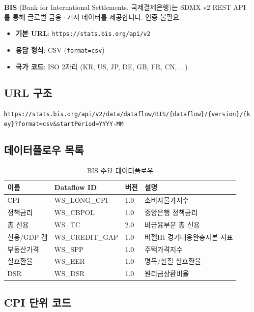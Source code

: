 \documentclass[11pt,a4paper]{article}
\newcommand{\apibox}[1]{%
    \noindent\colorbox{lightaccent}{\parbox{\dimexpr\textwidth-2\fboxsep}{%
        \small\texttt{#1}%
    }}%
    \vspace{0.5em}%
}
\newcommand{\code}[1]{\texttt{#1}}
\begin{document}
\textbf{BIS} (Bank for International Settlements, 국제결제은행)는 SDMX v2 REST API를 통해
글로벌 금융·거시 데이터를 제공합니다. 인증 불필요.

\begin{itemize}[leftmargin=2em]
    \item \textbf{기본 URL}: \code{https://stats.bis.org/api/v2}
    \item \textbf{응답 형식}: CSV (\code{format=csv})
    \item \textbf{국가 코드}: ISO 2자리 (KR, US, JP, DE, GB, FR, CN, ...)
\end{itemize}

\subsection{URL 구조}

\apibox{https://stats.bis.org/api/v2/data/dataflow/BIS/\{dataflow\}/\{version\}/\{key\}?format=csv\&startPeriod=YYYY-MM}

\subsection{데이터플로우 목록}

\begin{table}[h]
\centering
\caption{BIS 주요 데이터플로우}
\begin{tabularx}{\textwidth}{l l l X}
\toprule
\textbf{이름} & \textbf{Dataflow ID} & \textbf{버전} & \textbf{설명} \\
\midrule
CPI           & WS\_LONG\_CPI    & 1.0 & 소비자물가지수 \\
정책금리       & WS\_CBPOL        & 1.0 & 중앙은행 정책금리 \\
총 신용        & WS\_TC           & 2.0 & 비금융부문 총 신용 \\
신용/GDP 갭    & WS\_CREDIT\_GAP  & 1.0 & 바젤III 경기대응완충자본 지표 \\
부동산가격     & WS\_SPP          & 1.0 & 주택가격지수 \\
실효환율       & WS\_EER          & 1.0 & 명목/실질 실효환율 \\
DSR            & WS\_DSR          & 1.0 & 원리금상환비율 \\
\bottomrule
\end{tabularx}
\end{table}

\subsection{CPI 단위 코드}
\end{document}
